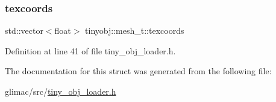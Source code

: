 \subsubsection{\texorpdfstring{texcoords}{texcoords}}
{\footnotesize\ttfamily std\+::vector$<$float$>$ tinyobj\+::mesh\+\_\+t\+::texcoords}



Definition at line 41 of file tiny\+\_\+obj\+\_\+loader.\+h.



The documentation for this struct was generated from the following file\+:\begin{DoxyCompactItemize}
\item 
glimac/src/\hyperlink{tiny__obj__loader_8h}{tiny\+\_\+obj\+\_\+loader.\+h}\end{DoxyCompactItemize}
